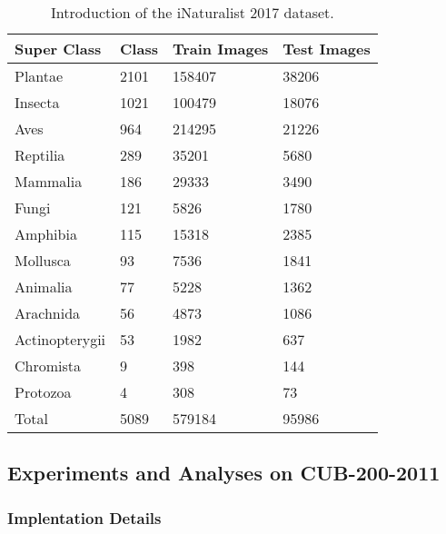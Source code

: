 \documentclass[sigconf, nonacm]{acmart}
\begin{document}
\begin{table}[!t]
 \centering
 \caption{Introduction of the iNaturalist 2017 dataset.}
 \label{table_inat2017}
 \begin{tabularx}{\linewidth}{|p{2cm}|Y|Y|Y|}
  \hline
  
  Super Class    & Class & Train Images & Test Images  \\ \hline
 
  Plantae    & 2101 & 158407 & 38206\\
  
  Insecta    & 1021 & 100479 & 18076\\  
  
  
  
  Aves    & 964 & 214295 & 21226\\
  
  Reptilia    & 289 & 35201 & 5680\\ 
  
  
  Mammalia    & 186 & 29333 & 3490\\ 


  Fungi   & 121 & 5826 & 1780\\ 
  Amphibia    & 115 & 15318 & 2385\\ 
  Mollusca    & 93 & 7536 & 1841\\
  Animalia    & 77 & 5228 & 1362 \\
  Arachnida    & 56 & 4873 & 1086 \\
  Actinopterygii    & 53 & 1982 & 637\\
  Chromista    & 9 & 398 & 144\\
  Protozoa    &  4 & 308 & 73 \\ \hline
  Total    & 5089 & 579184 & 95986 \\
  
  \hline
  
 \end{tabularx}
\end{table}



\subsection{Experiments and Analyses on CUB-200-2011}
\label{ Experiments on the CUB-200-2011}




\subsubsection{\textbf{Implentation Details}}
\end{document}

